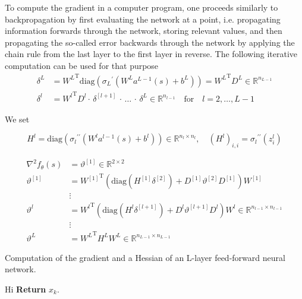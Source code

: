 To compute the gradient in a computer program, one proceeds similarly to backpropagation by first evaluating the network at a point, i.e. propagating information forwards through the network, storing relevant values, and then propagating the so-called error backwards through the network by applying the chain rule from the last layer to the first layer in reverse. The following iterative computation can be used for that purpose
\begin{align*}
    \delta^{L} & = {W^{L}}^{\mathrm{T}} \mathrm{diag}({\sigma_{L}}^{\prime}(W^{L} a^{L-1}(s) + b^{L})) = {W^{L}}^{\mathrm{T}} D^{L} \in \mathbb{R}^{n_{L-1}} \\
    \delta^{l} & = {W^{l}}^{\mathrm{T}} D^{l} \cdot \, \delta^{[l+1]} \, \cdot \, \ldots \,  \cdot \, \delta^{L} \in \mathbb{R}^{n_{l-1}} \quad \text{for} \quad l = 2, \ldots, L-1
\end{align*}


We set 

\begin{equation*}
    H^{l} = \mathrm{diag}({\sigma_{l}}^{\prime \prime}(W^{l} a^{l-1}(s) + b^{l})) \in \mathbb{R}^{n_l \times n_l}, \quad (H^{l})_{i, i} = {\sigma_{l}}^{\prime \prime} (z_{i}^{l})
\end{equation*}

\begin{align*}
    \nabla^{2} f_{\theta}(s) & = \vartheta^{[1]} \in \mathbb{R}^{2 \times 2} \\
    \vartheta^{[1]} & = {W^{[1]}}^{\mathrm{T}} \left( \mathrm{diag}(H^{[1]} \delta^{[2]}) + D^{[1]} \vartheta^{[2]} D^{[1]} \right) W^{[1]} \\
    & \vdots \\
    \vartheta^{l} & = {W^{l}}^{\mathrm{T}} \left( \mathrm{diag}(H^{l} \delta^{[l+1]}) + D^{l} \vartheta^{[l+1]} D^{l} \right) W^{l} \in \mathbb{R}^{n_{l-1} \times n_{l-1}} \\
    & \vdots \\
    \vartheta^{L} & = {W^{L}}^{\mathrm{T}} H^{L} W^{L} \in \mathbb{R}^{n_{L-1} \times n_{L-1}}
\end{align*}


\begin{algorithm}[H]
    \caption{Computation of the gradient and a Hessian of an L-layer feed-forward neural network.}
    \begin{algorithmic}[1]
        \State Hi
        \State \textbf{Return} $x_k$.
    \end{algorithmic}
\end{algorithm}




